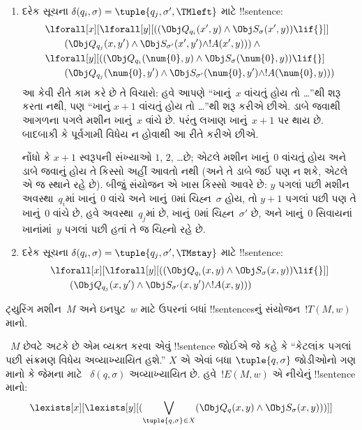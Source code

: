 \documentclass[../../../include/open-logic-section]{subfiles}
\begin{document}
\begin{enumerate}
\begin{enumerate}
\item {} દરેક સૂચના
  $\delta(q_i, \sigma) =
  \tuple{q_j, \sigma', \TMleft}$ માટે !!{sentence}:
\begin{align*}
& \lforall[x][\lforall[y][
    ((\Obj Q_{q_i}(x', y) \land \Obj S_{\sigma}(x', y)) \lif {}]]\\
& \qquad   (\Obj Q_{q_j}(x, y') \land \Obj S_{\sigma'}(x', y') \land
!A(x', y))) \land {}\\
& \lforall[y][((\Obj Q_{q_i}(\num{0}, y) \land \Obj S_{\sigma}(\num{0},
    y)) \lif {}]\\
& \qquad (\Obj Q_{q_j}(\num{0}, y') \land \Obj S_{\sigma'}(\num{0},
  y') \land !A(\num{0}, y)))
\end{align*}
આ કેવી રીતે કામ કરે છે તે વિચારો: હવે આપણે
``ખાનું~$x$ વાંચતું હોય તો \dots''થી શરૂ કરતા નથી,
પણ ``ખાનું $x+1$ વાંચતું હોય તો \dots''થી શરૂ કરીએ
છીએ. ડાબે જવાથી આગળના પગલે મશીન ખાનું~$x$
વાંચે છે. પરંતુ લખાણ ખાનું~$x+1$ પર થાય છે.
બાદબાકી કે પૂર્વગામી વિધેય ન હોવાથી આ રીતે કરીએ
છીએ.

નોંધો કે $x+1$ સ્વરૂપની સંખ્યાઓ $1$, $2$, \dots છે;
એટલે મશીન ખાનું~$0$ વાંચતું હોય અને ડાબે જવાનું હોય
તે કિસ્સો અહીં આવતો નથી (અને તે ડાબે જઈ પણ ન શકે,
એટલે એ જ સ્થાને રહે છે). બીજું સંયોજન એ ખાસ કિસ્સો
આવરે છે: $y$ પગલાં પછી મશીન અવસ્થા~$q_i$માં
ખાનું~$0$ વાંચે અને ખાનું~$0$માં ચિહ્ન~$\sigma$
હોય, તો $y+1$ પગલાં પછી પણ તે ખાનું~$0$ વાંચે છે,
હવે અવસ્થા~$q_j$માં છે, ખાનું~$0$માં ચિહ્ન~$\sigma'$
છે, અને ખાનું~$0$ સિવાયનાં ખાનાંમાં~$y$ પગલાં
પછી હતાં તે જ ચિહ્નો રહે છે.
\item {} દરેક સૂચના
  $\delta(q_i, \sigma) =
  \tuple{q_j, \sigma', \TMstay}$ માટે !!{sentence}:
\begin{align*}
& \lforall[x][\lforall[y][(
   (\Obj Q_{q_i}(x, y) \land \Obj S_{\sigma}(x, y)) \lif {}]] \\
&\qquad   (\Obj Q_{q_j}(x, y') \land \Obj S_{\sigma'}(x, y') \land
!A(x, y)))
\end{align*}
\end{enumerate}
\end{enumerate}
ટ્યુરિંગ મશીન~$M$ અને ઇનપુટ~$w$ માટે ઉપરનાં
બધાં !!{sentence}sનું સંયોજન~$!T(M, w)$ માનો.

~$M$ છેવટે અટકે છે એમ વ્યક્ત કરવા એવું !!{sentence}
જોઈએ જે કહે કે ``કેટલાંક પગલાં પછી સંક્રમણ વિધેય
અવ્યાખ્યાયિત હશે.'' $X$ એ એવાં બધા
$\tuple{q, \sigma}$ જોડીઓનો ગણ માનો કે જેમના માટે
~$\delta(q, \sigma)$ અવ્યાખ્યાયિત છે. હવે~$!E(M, w)$
એ નીચેનું !!{sentence} માનો:
\[
\lexists[x][\lexists[y][(\bigvee_{\tuple{q, \sigma} \in
      X}(\Obj Q_q(x, y) \land \Obj S_\sigma(x, y)))]]
\]
\end{document}
